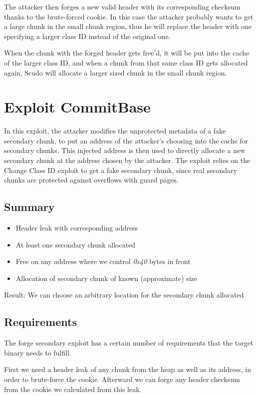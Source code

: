 \documentclass[a4paper,11pt,oneside]{report}
\begin{document}
The attacker then forges a new valid header with its corresponding checksum thanks to
the brute-forced cookie. 
In this case the attacker probably wants to get a large chunk in
the small chunk region, thus he will replace the header with one specifying a larger class
ID instead of the original one.

When the chunk with the forged header gets free'd, it will be put into the cache of the
larger class ID, and when a chunk from that same class ID gets allocated again, Scudo will
allocate a larger sized chunk in the small chunk region.

\section{Exploit CommitBase}

In this exploit, the attacker modifies the unprotected metadata of a fake secondary chunk,
to put an address of the attacker's choosing into the cache for secondary chunks. This
injected address is then used to directly allocate a new secondary chunk at the address
chosen by the attacker. The exploit relies on the Change Class ID exploit to get a fake
secondary chunk, since real secondary chunks are protected against overflows with guard
pages.

\subsection{Summary}

\begin{itemize}
\item Header leak with corresponding address
\item At least one secondary chunk allocated
\item Free on any address where we control \emph{0x40} bytes in front
\item Allocation of secondary chunk of known (approximate) size
\end{itemize}

Result: We can choose an arbitrary location for the secondary chunk allocated

\subsection{Requirements}

The forge secondary exploit has a certain number of requirements that the target binary
needs to fulfill.

First we need a header leak of any chunk from the heap as well as its address, in
order to brute-force the cookie. Afterward we can forge any header checksum from the
cookie we calculated from this leak.
\end{document}
